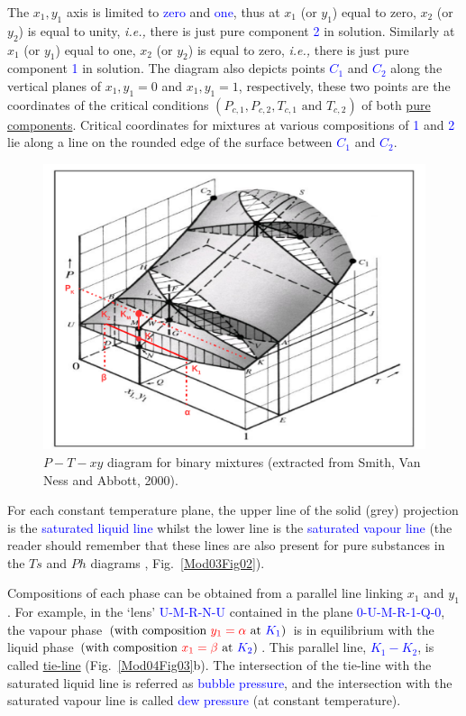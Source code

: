 \documentclass[12pts,a4paper,amsmath,amssymb,floatfix]{article}%
\newcommand{\red}{\textcolor{red}}
\newcommand{\blue}{\textcolor{blue}}
\newcommand{\ie}{{\it i.e., }}
\begin{document}
The $x_{1},y_{1}$ axis is limited to \blue{zero} and \blue{one}, thus at $x_{1}$ (or $y_{1}$) equal to zero, $x_{2}$ (or $y_{2}$) is equal to unity, \ie there is just pure component \blue{2} in solution. Similarly at $x_{1}$ (or $y_{1}$) equal to one, $x_{2}$ (or $y_{2}$) is equal to zero, \ie there is just pure component \blue{1} in solution. The diagram also depicts points \blue{$C_{1}$} and \blue{$C_{2}$} along the vertical planes of $x_{1},y_{1}=0$ and $x_{1},y_{1}=1$, respectively, these two points are the coordinates of the critical conditions $\left(P_{c,1}, P_{c,2}, T_{c,1} \text{ and } T_{c,2}\right)$ of both \underline{pure components}. Critical coordinates for mixtures at various compositions of \blue{1} and \blue{2} lie along a line on the rounded edge of the surface between \blue{$C_{1}$} and \blue{$C_{2}$}.
      \begin{figure}[h] 
         \begin{center}
             \includegraphics[width=.75\columnwidth,clip]{./Figs/PTxy_Digram} 
             \vspace{-.1cm}\caption{$P-T-xy$ diagram for binary mixtures (extracted from Smith, Van Ness and Abbott, 2000).}\label{Mod04Fig02}
         \end{center}
       \end{figure}
For each constant temperature plane, the upper line of the solid (grey) projection is the \blue{saturated liquid line} whilst the lower line is the \blue{saturated vapour line} (the reader should remember that these lines are also present for pure substances in the $Ts$ and $Ph$ diagrams , Fig.~\ref{Mod03Fig02}).

Compositions of each phase can be obtained from a parallel line linking $x_{1}$ and $y_{1}$. For example, in the `lens' \blue{U-M-R-N-U} contained in the plane \blue{0-U-M-R-1-Q-0}, the vapour phase $\left(\text{with composition }\red{y_{1}=\alpha}\text{ at } \blue{K_{1}}\right)$ is in equilibrium with the liquid phase $\left(\text{with composition }\red{x_{1}=\beta}\text{ at } \blue{K_{2}}\right)$. This parallel line, \blue{$K_{1}-K_{2}$}, is called \underline{tie-line} (Fig.~\ref{Mod04Fig03}b). The intersection of the tie-line with the saturated liquid line is referred as \blue{bubble pressure}, and the intersection with the saturated vapour line is called \blue{dew pressure} (at constant temperature).
\end{document}
